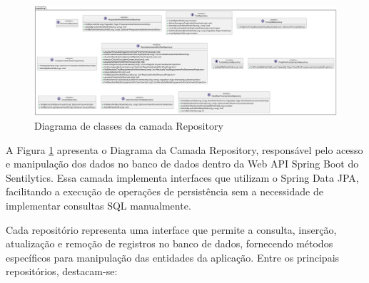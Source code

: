 \documentclass[
	12pt,				%
	oneside,			%
	a4paper,			%
	english,			%
	french,				%
	spanish,			%
	brazil				%
	]{abntex2}
\begin{document}
\begin{figure}[htbp]
\hypertarget{diagram_repository}{%
\caption{Diagrama de classes da camada Repository}\label{diagram_repository}
\begin{center}
\includegraphics[scale=0.2]{imagens/sentilytics/diagramas/classes/repository-classes.png}
\end{center}
}
\end{figure}

A Figura \ref{diagram_repository} apresenta o Diagrama da Camada
Repository, responsável pelo acesso e manipulação dos dados no banco de
dados dentro da Web API Spring Boot do Sentilytics. Essa camada
implementa interfaces que utilizam o Spring Data JPA, facilitando a
execução de operações de persistência sem a necessidade de implementar
consultas SQL manualmente.

Cada repositório representa uma interface que permite a consulta,
inserção, atualização e remoção de registros no banco de dados,
fornecendo métodos específicos para manipulação das entidades da
aplicação. Entre os principais repositórios, destacam-se:
\end{document}
